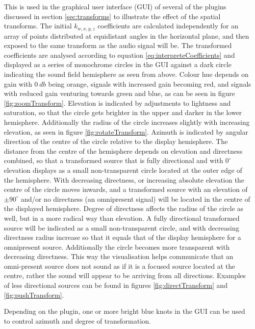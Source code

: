\documentclass{article}
\begin{document}
This is used in the graphical user interface (GUI) of several of the plugins discussed in section \ref{sec:transforms} to illustrate the effect of the spatial transforms. 
The initial $k_{w, x, y, z}$ coefficients are calculated independently for an array of points distributed at equidistant angles in the horizontal plane, and then exposed to the same transform as the audio signal will be. 
The transformed coefficients are analysed according to equation \ref{eq:interpreteCoefficients} and displayed as a series of monochrome circles in the GUI against a dark circle indicating the sound field hemisphere as seen from above.
Colour hue depends on gain with $0\: db$ being orange, signals with increased gain becoming red, and signals with reduced gain venturing towards green and blue, as can be seen in figure \ref{fig:zoomTransform}.
Elevation is indicated by adjustments to lightness and saturation, so that the circle gets brighter in the upper and darker in the lower hemisphere.
Additionally the radius of the circle increases slightly with increasing elevation, as seen in figure \ref{fig:rotateTransform}.
Azimuth is indicated by angular direction of the centre of the circle relative to the display hemisphere.
The distance from the centre of the hemisphere depends on elevation and directness combined, so that a transformed source that is fully directional and with $0^{\circ}$ elevation displays as a small non-transparent circle located at the outer edge of the hemisphere.
With decreasing directness, or increasing absolute elevation the centre of the circle moves inwards, and a transformed source with an elevation of $\pm 90^{\circ}$ and/or no directness (an omnipresent signal) will be located in the centre of the displayed hemisphere.
Degree of directness affects the radius of the circle as well, but in a more radical way than elevation. A fully directional transformed source will be indicated as a small non-transparent circle, and with decreasing directness radius increase so that it equals that of the display hemisphere for a omnipresent source.
Additionally the circle becomes more transparent with decreasing directness.
This way the visualisation helps communicate that an omni-present source does not sound as if it is a focused source located at the centre, rather the sound will appear to be arriving from all directions.
Examples of less directional sources can be found in figures \ref{fig:directTransform} and \ref{fig:pushTransform}.

Depending on the plugin, one or more bright blue knots in the GUI can be used to control azimuth and degree of transformation.
\end{document}
